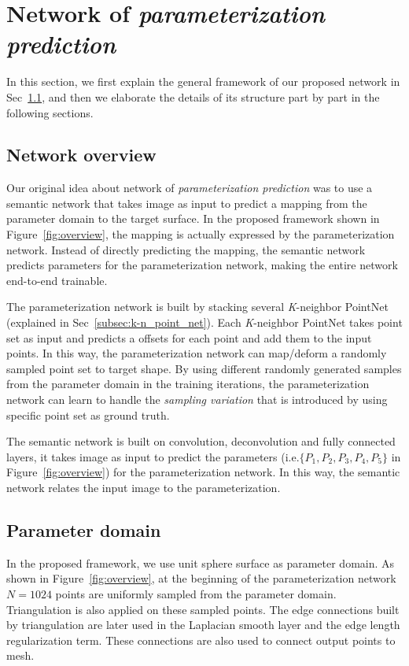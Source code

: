 \section{Network of \emph{parameterization prediction}}
In this section, we first explain the general framework of our proposed network in Sec~\ref{subsec:overview}, and then we elaborate the details of its structure part by part in the following sections.

\subsection{Network overview}
\label{subsec:overview}
Our original idea about network of \emph{parameterization prediction} was to use a semantic network that takes image as input to predict a mapping from the parameter domain to the target surface. In the proposed framework shown in Figure~\ref{fig:overview}, the mapping is actually expressed by the parameterization network. Instead of directly predicting the mapping, the semantic network predicts parameters for the parameterization network, making the entire network end-to-end trainable.

The parameterization network is built by stacking several \textit{K}-neighbor PointNet (explained in Sec~\ref{subsec:k-n_point_net}). Each \textit{K}-neighbor PointNet takes point set as input and predicts a offsets for each point and add them to the input points. In this way, the parameterization network can map/deform a randomly sampled point set to target shape. By using different randomly generated samples from the parameter domain in the training iterations, the parameterization network can learn to handle the \textit{sampling variation} that is introduced by using specific point set as ground truth. 

The semantic network is built on convolution, deconvolution and fully connected layers, it takes image as input to predict the parameters (i.e.$\{P_1,P_2,P_3,P_4,P_5\}$ in Figure~\ref{fig:overview}) for the parameterization network. In this way, the semantic network relates the input image to the parameterization.
\subsection{Parameter domain}
In the proposed framework, we use unit sphere surface as parameter domain. As shown in Figure~\ref{fig:overview}, at the beginning of the parameterization network $N=1024$ points are uniformly sampled from the parameter domain. Triangulation is also applied on these sampled points. The edge connections built by triangulation are later used in the Laplacian smooth layer and the edge length regularization term. These connections are also used to connect output points to mesh.
